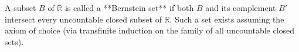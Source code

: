 A subset $B$ of $\mathbb{R}$ is called a **Bernstein set** if both $B$ and its complement $B'$ intersect every uncountable closed subset of $\mathbb{R}$. Such a set exists assuming the axiom of choice (via transfinite induction on the family of all uncountable closed sets).